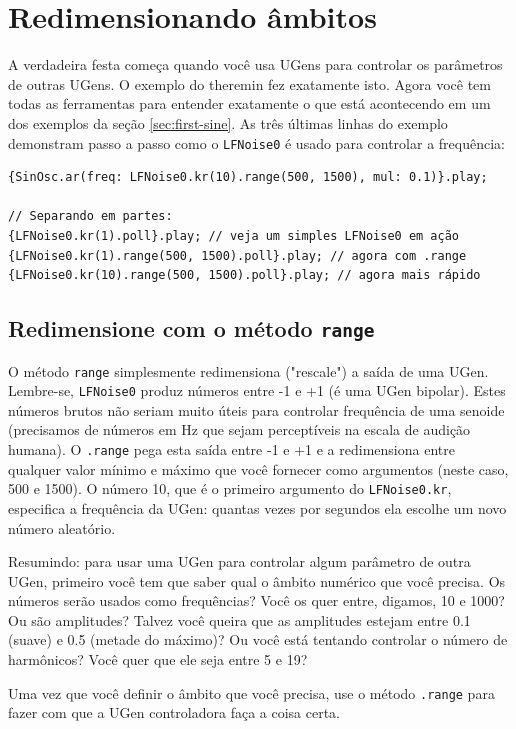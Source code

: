 \section{Redimensionando âmbitos}

A verdadeira festa começa quando você usa UGens para controlar os parâmetros de outras UGens. O exemplo do theremin fez exatamente isto. Agora você tem todas as ferramentas para entender exatamente o que está acontecendo em um dos exemplos da seção \ref{sec:first-sine}. As três últimas linhas do exemplo demonstram passo a passo como o \texttt{LFNoise0} é usado para controlar a frequência:

\begin{lstlisting}[style=SuperCollider-IDE, basicstyle=\scttfamily\footnotesize]
{SinOsc.ar(freq: LFNoise0.kr(10).range(500, 1500), mul: 0.1)}.play;

// Separando em partes:
{LFNoise0.kr(1).poll}.play; // veja um simples LFNoise0 em ação
{LFNoise0.kr(1).range(500, 1500).poll}.play; // agora com .range
{LFNoise0.kr(10).range(500, 1500).poll}.play; // agora mais rápido
\end{lstlisting}

\subsection{Redimensione com o método \texttt{range}}
O método  \texttt{range} simplesmente redimensiona ("rescale") a saída de uma UGen. Lembre-se, \texttt{LFNoise0} produz números entre -1 e +1 (é uma UGen bipolar). Estes números brutos não seriam muito úteis para controlar frequência de uma senoide (precisamos de números em Hz que sejam perceptíveis na escala de audição humana). O \texttt{.range} pega esta saída entre -1 e +1 e a redimensiona entre qualquer valor mínimo e máximo que você fornecer como argumentos (neste caso, 500 e 1500). O número 10, que é o primeiro argumento do \texttt{LFNoise0.kr}, especifica a frequência da UGen: quantas vezes por segundos ela escolhe um novo número aleatório.

Resumindo: para usar uma UGen para controlar algum parâmetro de outra UGen, primeiro você tem que saber qual o âmbito numérico que você precisa. Os números serão usados como frequências? Você os quer entre, digamos, 10 e 1000? Ou são amplitudes? Talvez você queira que as amplitudes estejam entre 0.1 (suave) e 0.5 (metade do máximo)? Ou você está tentando controlar o número de harmônicos? Você quer que ele seja entre 5 e 19?

Uma vez que você definir o âmbito que você precisa, use o método \texttt{.range} para fazer com que a UGen controladora faça a coisa certa.

